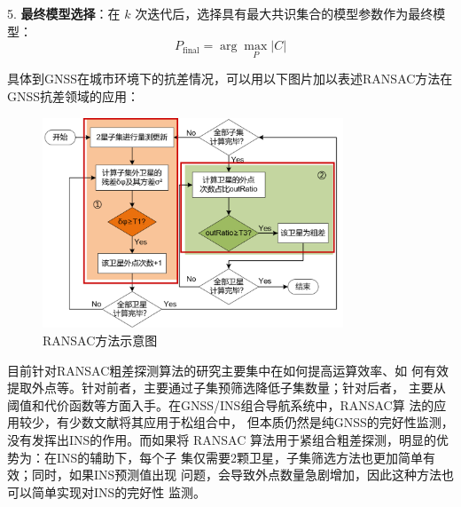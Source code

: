 \documentclass[12pt,hyperref,a4paper,UTF8]{ctexart}
\begin{document}
5. \textbf{最终模型选择}：在 \( k \) 次迭代后，选择具有最大共识集合的模型参数作为最终模型：
\begin{equation}
    P_{\text{final}} = \arg\max_{P} |C|
\end{equation}

具体到GNSS在城市环境下的抗差情况，可以用以下图片加以表述RANSAC方法在GNSS抗差领域的应用\cite{Ding_long}：
\begin{figure}[H]
    \centering
    \includegraphics[width=0.8\textwidth]{figures/RANSAC方法.png}
    \caption{RANSAC方法示意图}
    \label{figure-ransac}
\end{figure}
    
目前针对RANSAC粗差探测算法的研究主要集中在如何提高运算效率、如
何有效提取外点等。针对前者，主要通过子集预筛选降低子集数量；针对后者，
主要从阈值和代价函数等方面入手。在GNSS/INS组合导航系统中，RANSAC算
法的应用较少，有少数文献将其应用于松组合中\cite{Sunran2021}，
但本质仍然是纯GNSS的完好性监测，没有发挥出INS的作用。而如果将
RANSAC 算法用于紧组合粗差探测，明显的优势为：在INS的辅助下，每个子
集仅需要2颗卫星，子集筛选方法也更加简单有效；同时，如果INS预测值出现
问题，会导致外点数量急剧增加，因此这种方法也可以简单实现对INS的完好性
监测。
\end{document}
